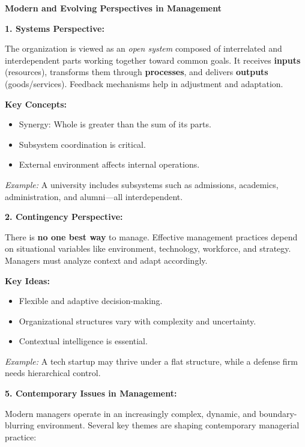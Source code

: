 \documentclass[10pt,a4paper]{book}
\begin{document}
\begin{multicols}{2}

\textbf{Modern and Evolving Perspectives in Management}

\textbf{1. Systems Perspective:}

The organization is viewed as an \textit{open system} composed of interrelated and interdependent parts working together toward common goals. It receives \textbf{inputs} (resources), transforms them through \textbf{processes}, and delivers \textbf{outputs} (goods/services). Feedback mechanisms help in adjustment and adaptation.

\textbf{Key Concepts:}
\begin{itemize}
    \item Synergy: Whole is greater than the sum of its parts.
    \item Subsystem coordination is critical.
    \item External environment affects internal operations.
\end{itemize}

\textit{Example:} A university includes subsystems such as admissions, academics, administration, and alumni—all interdependent.

\vspace{0.5cm}

\textbf{2. Contingency Perspective:}

There is \textbf{no one best way} to manage. Effective management practices depend on situational variables like environment, technology, workforce, and strategy. Managers must analyze context and adapt accordingly.

\textbf{Key Ideas:}
\begin{itemize}
    \item Flexible and adaptive decision-making.
    \item Organizational structures vary with complexity and uncertainty.
    \item Contextual intelligence is essential.
\end{itemize}

\textit{Example:} A tech startup may thrive under a flat structure, while a defense firm needs hierarchical control.

\vspace{0.5cm}

\textbf{5. Contemporary Issues in Management:}

Modern managers operate in an increasingly complex, dynamic, and boundary-blurring environment. Several key themes are shaping contemporary managerial practice:


\end{multicols}
\end{document}
